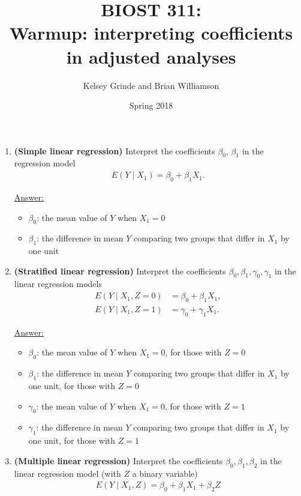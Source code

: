 \documentclass{article}
\begin{document}
\title{BIOST 311: \\ Warmup: interpreting coefficients in adjusted analyses}
\author{Kelsey Grinde and Brian Williamson}
\date{Spring 2018}

\maketitle

\begin{enumerate}
\item \textbf{(Simple linear regression)} Interpret the coefficients $\beta_0$, $\beta_1$ in the regression model 
\begin{align*}
E(Y \mid X_1) = \beta_0 + \beta_1 X_1.
\end{align*}

\color{blue}
\underline{Answer:} 
\begin{itemize}
\item $\beta_0$: the mean value of $Y$ when $X_1 = 0$
\item $\beta_1$: the difference in mean $Y$ comparing two groups that differ in $X_1$ by one unit
\end{itemize} 
\color{black}

\item \textbf{(Stratified linear regression)} Interpret the coefficients $\beta_0, \beta_1, \gamma_0, \gamma_1$ in the linear regression models
\begin{align*}
E(Y \mid X_1, Z = 0) &= \beta_0 + \beta_1 X_1, \\
E(Y \mid X_1, Z = 1) &= \gamma_0 + \gamma_1 X_1.
\end{align*}

\color{blue}
\underline{Answer:} 
\begin{itemize}
\item $\beta_0$: the mean value of $Y$ when $X_1 = 0$, for those with $Z = 0$
\item $\beta_1$: the difference in mean $Y$ comparing two groups that differ in $X_1$ by one unit, for those with $Z = 0$
\item $\gamma_0$: the mean value of $Y$ when $X_1 = 0$, for those with $Z = 1$
\item $\gamma_1$: the difference in mean $Y$ comparing two groups that differ in $X_1$ by one unit, for those with $Z = 1$
\end{itemize} 
\color{black}

\newpage
\item \textbf{(Multiple linear regression)} Interpret the coefficients $\beta_0, \beta_1, \beta_2$ in the linear regression model (with $Z$ a binary variable)
\begin{align*}
E(Y \mid X_1, Z) = \beta_0 + \beta_1 X_1 + \beta_2 Z
\end{align*}


\end{enumerate}
\end{document}
